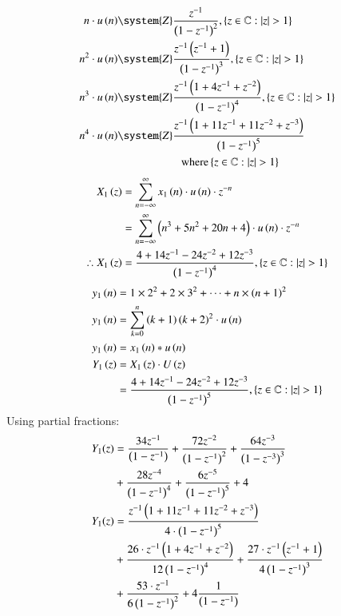 \documentclass[journal,12pt,twocolumn]{IEEEtran}
\theoremstyle{remark}
\begin{document}
\begin{enumerate}[label=\arabic*.]
\begin{align}
    n\cdot u\brak{n} & \system{Z} \frac{z^{-1}}{\brak{1-z^{-1}}^2} ,\cbrak{z\in\mathbb{C} : \lvert z \rvert > 1} \\
     n^2\cdot u\brak{n} & \system{Z} \frac{z^{-1}\brak{z^{-1}+1}}{\brak{1-z^{-1}}^3} ,\cbrak{z\in\mathbb{C} : \lvert z \rvert > 1} \\
     n^3\cdot u\brak{n} & \system{Z} \frac{z^{-1}\brak{1+4z^{-1}+z^{-2}}}{\brak{1-z^{-1}}^4} ,\cbrak{z\in\mathbb{C} : \lvert z \rvert > 1} \\
    n^4\cdot u\brak{n} & \system{Z} \frac{z^{-1}\brak{1+11z^{-1}+11z^{-2}+z^{-3}}}{\brak{1-z^{-1}}^5}\\ &  \hspace{2cm}\text{where} \cbrak{z\in\mathbb{C} :\lvert z \rvert > 1} \notag 
\end{align}
\begin{align}
 X_1\left(z\right) &= \sum_{n=-\infty}^\infty x_1\left(n\right)\cdot u\left(n\right)\cdot z^{-n}\\
             &= \sum_{n=-\infty}^\infty \left(n^{3} + 5n^{2} + 20n + 4\right)\cdot u\left(n\right)\cdot z^{-n}\\
 \therefore   X_1\left(z\right)&= \frac{4+14z^{-1}-24z^{-2}+12z^{-3}}{\left(1-z^{-1}\right)^4} ,\left\{z\in\mathbb{C} : \lvert z \rvert > 1\right\} 
\end{align}
\begin{align}
y_1\left(n\right)&=1\times2^2 + 2\times3^2 + \dots + n\times\left(n+1\right)^2 \\
y_1\left(n\right) &= \sum_{k=0}^n \left(k+1\right)\left(k+2\right)^2\cdot u\left(n\right) \\
y_1\left(n\right) &= x_1\left(n\right)\ast u\left(n\right)\\
    Y_1\left(z\right) &= X_1\left(z\right)\cdot U\left(z\right) \\
 &= \frac{4+14z^{-1}-24z^{-2}+12z^{-3}}{\left(1-z^{-1}\right)^5} ,\left\{z\in\mathbb{C} : \lvert z \rvert > 1\right\} 
\end{align}
Using partial fractions:
\begin{align}
    Y_1(z) &= \frac{34z^{-1}}{\left(1-z^{-1}\right)} + \frac{72z^{-2}}{\left(1-z^{-1}\right)^2} + \frac{64z^{-3}}{\left(1-z^{-3}\right)^3} \\
    &+ \frac{28z^{-4}}{\left(1-z^{-1}\right)^4}+\frac{6z^{-5}}{\left(1-z^{-1}\right)^5}+4 \notag \\
    Y_1(z) &= \frac{z^{-1}\left(1+11z^{-1}+11z^{-2}+z^{-3}\right)}{4\cdot \left(1-z^{-1}\right)^5} \\ &+ \frac{26\cdot z^{-1}\left(1+4z^{-1}+z^{-2}\right)}{12\left(1-z^{-1}\right)^4} 
    + \frac{27\cdot z^{-1}\left(z^{-1}+1\right)}{4\left(1-z^{-1}\right)^3} \notag \\ &+\frac{53\cdot z^{-1}}{6\left(1-z^{-1}\right)^2} \notag 
    + 4 \frac{1}{\left(1-z^{-1}\right)} \notag
\end{align}


\end{enumerate}
\end{document}
